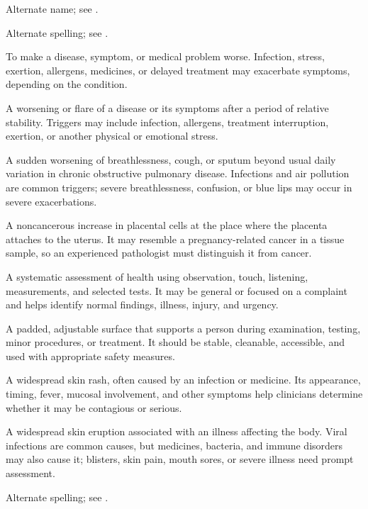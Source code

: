  Alternate name; see .

 Alternate spelling; see .

 To make a disease, symptom, or medical problem worse. Infection, stress, exertion, allergens, medicines, or delayed treatment may exacerbate symptoms, depending on the condition.

 A worsening or flare of a disease or its symptoms after a period of relative stability. Triggers may include infection, allergens, treatment interruption, exertion, or another physical or emotional stress.

 A sudden worsening of breathlessness, cough, or sputum beyond usual daily variation in chronic obstructive pulmonary disease. Infections and air pollution are common triggers; severe breathlessness, confusion, or blue lips may occur in severe exacerbations.

 A noncancerous increase in placental cells at the place where the placenta attaches to the uterus. It may resemble a pregnancy-related cancer in a tissue sample, so an experienced pathologist must distinguish it from cancer.

 A systematic assessment of health using observation, touch, listening, measurements, and selected tests. It may be general or focused on a complaint and helps identify normal findings, illness, injury, and urgency.

 A padded, adjustable surface that supports a person during examination, testing, minor procedures, or treatment. It should be stable, cleanable, accessible, and used with appropriate safety measures.

 A widespread skin rash, often caused by an infection or medicine. Its appearance, timing, fever, mucosal involvement, and other symptoms help clinicians determine whether it may be contagious or serious.

 A widespread skin eruption associated with an illness affecting the body. Viral infections are common causes, but medicines, bacteria, and immune disorders may also cause it; blisters, skin pain, mouth sores, or severe illness need prompt assessment.

 Alternate spelling; see .

